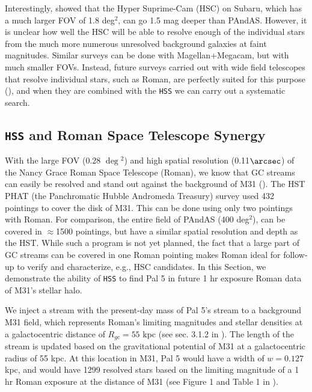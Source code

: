 \documentclass[twocolumn]{aastex631}
\begin{document}
Interestingly, \citet{patel18} showed that the Hyper Suprime-Cam (HSC) on Subaru, which has a much larger FOV of 1.8 deg$^2$, can go 1.5 mag deeper than PAndAS. However, it is unclear how well the HSC will be able to resolve enough of the individual stars from the much more numerous unresolved background galaxies at faint magnitudes. Similar surveys can be done with Magellan+Megacam, but with much smaller FOVs. Instead, future surveys carried out with wide field telescopes that resolve individual stars, such as Roman, are perfectly suited for this purpose (), and when they are combined with the \texttt{HSS} we can carry out a systematic search. 

\subsection{\texttt{HSS} and Roman Space Telescope Synergy}\label{sec:rst}
With the large FOV (0.28 $\deg{^2}$) and high spatial resolution (0.11$\arcsec$) of the Nancy Grace Roman Space Telescope (Roman), we know that GC streams can easily be resolved and stand out against the background of M31  (). The HST PHAT (the Panchromatic Hubble Andromeda Treasury) survey \citep{phat12} used 432 pointings to cover the disk of M31. This can be done using only two pointings with Roman. For comparison, the entire field of PAndAS (400 deg${^2}$), can be covered in $\approx$1500 pointings, but have a similar spatial resolution and depth as the HST. While such a program is not yet planned, the fact that a large part of GC streams can be covered in one Roman pointing makes Roman ideal for follow-up to verify and characterize, e.g., HSC candidates. 
In this Section, we demonstrate the ability of \texttt{HSS} to find Pal 5 in future 1 hr exposure Roman data of M31's stellar halo.

We inject a stream with the present-day mass of Pal 5's stream \citep[i.e., not with ten times the mass]{ibata17} to a background M31 field, which represents Roman's limiting magnitudes and stellar densities at a galactocentric distance of $R_{gc} = 55$ kpc (see sec. 3.1.2 in ). The length of the stream is updated based on the gravitational potential of M31 at a galactocentric radius of 55 kpc. At this location in M31, Pal 5 would have a width of $w = 0.127$ kpc, and would have 1299 resolved stars based on the limiting magnitude of a 1 hr Roman exposure at the distance of M31 (see Figure 1 and Table 1 in ). 
\end{document}
